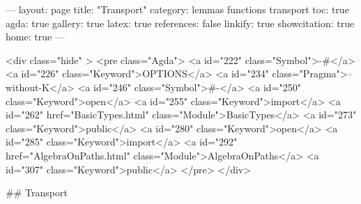 
---
layout: page
title: "Transport"
category: lemmas functions transport
toc: true
agda: true
gallery: true
latex: true
references: false
linkify: true
showcitation: true
home: true
---

<div class="hide" >
<pre class="Agda">
<a id="222" class="Symbol">{-#</a> <a id="226" class="Keyword">OPTIONS</a> <a id="234" class="Pragma">--without-K</a> <a id="246" class="Symbol">#-}</a>
<a id="250" class="Keyword">open</a> <a id="255" class="Keyword">import</a> <a id="262" href="BasicTypes.html" class="Module">BasicTypes</a> <a id="273" class="Keyword">public</a>
<a id="280" class="Keyword">open</a> <a id="285" class="Keyword">import</a> <a id="292" href="AlgebraOnPaths.html" class="Module">AlgebraOnPaths</a> <a id="307" class="Keyword">public</a>
</pre>
</div>

## Transport

